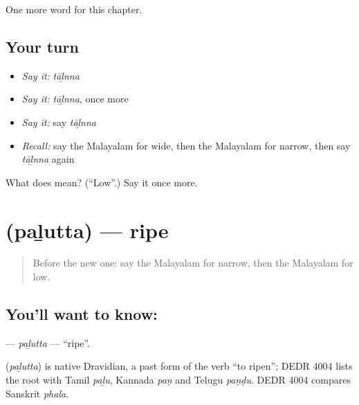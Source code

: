 \begin{grammarlens}[title={What you've built}]
One more word for this chapter.
\end{grammarlens}

\subsection*{Your turn}
\begin{itemize}
\raggedright
  \item \emph{Say it:} \emph{tāḻnna}
  \item \emph{Say it:} \emph{tāḻnna}, once more
  \item \emph{Say it:} say \emph{tāḻnna}
  \item \emph{Recall:} say the Malayalam for wide, then the Malayalam for narrow, then say \emph{tāḻnna} again
\end{itemize}

\begin{tcolorbox}[breakable,colback=teal!4,colframe=teal!35!black,title={Before you move on}]
What does  mean? (\textquotedblleft{}Low\textquotedblright{}.) Say it once more.
\end{tcolorbox}
\section[\texorpdfstring{\ml{പഴുത്ത} (paḻutta)}{പഴുത്ത (paḻutta)}]{ (paḻutta) — ripe}

\label{lesson:ML-C168-palutta}



\begin{quote}
Before the new one: say the Malayalam for narrow, then the Malayalam for low.
\end{quote}

\subsection*{You'll want to know: }
\textbf{} — \emph{paḻutta} — \textquotedblleft{}ripe\textquotedblright{}.

\begin{cousinweb}
\textbf{} (\emph{paḻutta}) is native Dravidian, a past form of the verb \textquotedblleft{}to ripen\textquotedblright{}; DEDR 4004 lists the root with Tamil \emph{paḻu}, Kannada \emph{paṇ} and Telugu \emph{paṇḍu}. DEDR 4004 compares Sanskrit \emph{phala}.
\end{cousinweb}

